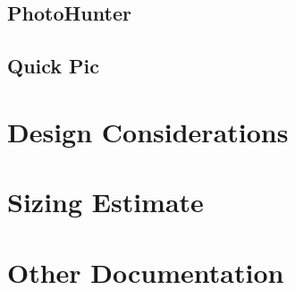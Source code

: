 \documentclass{article}
\begin{document}
\subsection{PhotoHunter}

\subsection{Quick Pic}

\section{Design Considerations}

\section{Sizing Estimate}

\section{Other Documentation}
\end{document}
